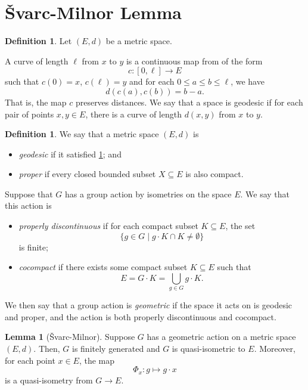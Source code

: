 \documentclass[11pt,a4paper,reqno]{amsart}
\theoremstyle{plain}
\theoremstyle{definition}
\newtheorem{lemma}[theorem]{Lemma}
\newtheorem{definition}[theorem]{Definition}
\theoremstyle{definition}
\renewcommand\leq\leqslant
\begin{document}
\section{Švarc-Milnor Lemma}


\begin{definition}\label{def:geodesic}
	Let $(E,d)$ be a metric space.
	
	A curve of length $\ell$ from $x$ to $y$ is a continuous map from of the form
	\[
		c\colon
		[0,\ell] \to E
	\]
	such that $c(0)=x$, $c(\ell)=y$ and for each $0\leq a \leq b \leq \ell$, we have
	\[
		d(c(a), c(b)) = b-a.
	\]
	That is, the map $c$ preserves distances.
	We say that a space is geodesic if for each pair of points $x,y\in E$, there is a curve of length $d(x,y)$ from $x$ to $y$.
\end{definition}


\begin{definition}
	We say that a metric space $(E,d)$ is 
	\begin{itemize}
		\item \emph{geodesic} if it satisfied \cref{def:geodesic}; and
		\item \emph{proper} if every closed bounded subset $X \subseteq E$ is also compact.
	\end{itemize}
	
	Suppose that $G$ has a group action by isometries on the space $E$.
	We say that this action is
	\begin{itemize}
		\item \emph{properly discontinuous} if for each compact subset $K \subseteq E$, the set
		\[
		\{
		g\in G
		\mid
		g\cdot K \cap K \neq \emptyset
		\}
		\]
		is finite;
		\item \emph{cocompact} if there exists some compact subset $K \subseteq E$ such that
		\[
		E = G\cdot K = \bigcup_{g\in G} g\cdot K.
		\]
	\end{itemize}
	We then say that a group action is \emph{geometric} if the space it acts on is geodesic and proper, and the action is both properly discontinuous and cocompact.
\end{definition}


\begin{lemma}[Švarc-Milnor]
	Suppose $G$ has a geometric action on a metric space $(E,d)$.
	Then, $G$ is finitely generated and $G$ is quasi-isometric to $E$.
	Moreover, for each point $x\in E$, the map
	\[
		\Phi_x\colon g \mapsto g\cdot x
	\]
	is a quasi-isometry from $G\to E$.
\end{lemma}
\end{document}
